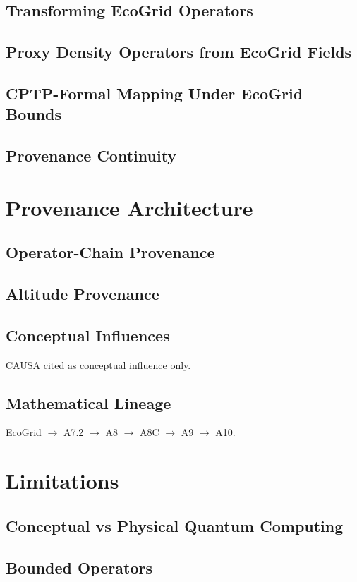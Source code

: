 \documentclass[11pt]{article}
\begin{document}
\subsection{Transforming EcoGrid Operators}
\subsection{Proxy Density Operators from EcoGrid Fields}
\subsection{CPTP-Formal Mapping Under EcoGrid Bounds}
\subsection{Provenance Continuity}

\section{Provenance Architecture}
\subsection{Operator-Chain Provenance}
\subsection{Altitude Provenance}
\subsection{Conceptual Influences}
CAUSA cited as conceptual influence only.
\subsection{Mathematical Lineage}
EcoGrid $\rightarrow$ A7.2 $\rightarrow$ A8 $\rightarrow$ A8C $\rightarrow$ A9 $\rightarrow$ A10.

\section{Limitations}
\subsection{Conceptual vs Physical Quantum Computing}
\subsection{Bounded Operators}
\end{document}

